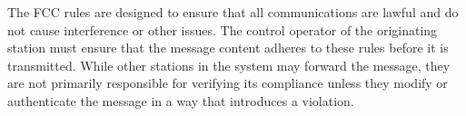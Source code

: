 The FCC rules are designed to ensure that all communications are lawful and do not cause interference or other issues. The control operator of the originating station must ensure that the message content adheres to these rules before it is transmitted. While other stations in the system may forward the message, they are not primarily responsible for verifying its compliance unless they modify or authenticate the message in a way that introduces a violation.

